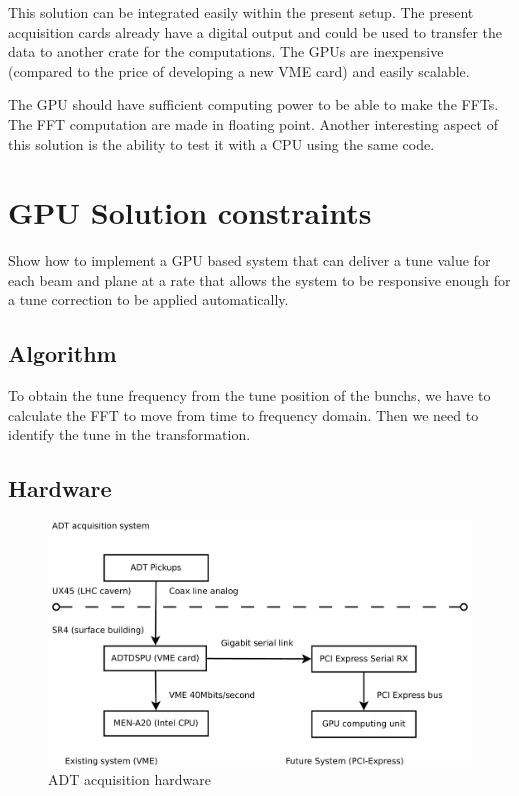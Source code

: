This solution can be integrated easily within the present setup. The present acquisition cards already have a digital output and could be used to transfer the data to another crate for the computations. The \glspl{GPU} are inexpensive (compared to the price of developing a new \gls{VME} card) and easily scalable. 

The \gls{GPU} should have sufficient computing power to be able to make the \glspl{FFT}. The \gls{FFT} computation are made in floating point. Another interesting aspect of this solution is the ability to test it with a \gls{CPU} using the same code.

\section{GPU Solution constraints}

Show how to implement a GPU based system that can deliver a tune value for each beam and plane at a rate that allows the system to be responsive enough for a tune correction to be applied automatically. 

   \subsection{Algorithm}

   To obtain the tune frequency from the tune position of the \glspl{bunch}, we have to calculate the FFT to move from time to frequency domain. Then we need to identify the tune in the transformation.

   \subsection{Hardware}

   \begin{figure}[H]
	\caption{ADT acquisition hardware}
	\centering
	\includegraphics[scale=0.3]{acquisition.pdf}
	\end{figure}

